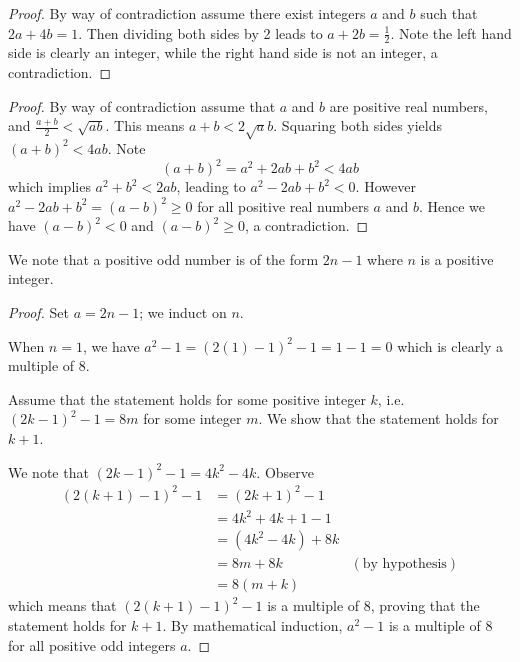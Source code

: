 \begin{questions}
    \item \begin{proof}
        By way of contradiction assume there exist integers $a$ and $b$ such that $2a + 4b = 1$. Then dividing both sides by 2 leads to $a + 2b = \frac12$. Note the left hand side is clearly an integer, while the right hand side is not an integer, a contradiction.    
    \end{proof}
    
    \item \begin{proof}
        By way of contradiction assume that $a$ and $b$ are positive real numbers, and $\frac{a+b}{2} < \sqrt{ab}$. This means $a+b<2\sqrt ab$. Squaring both sides yields $(a+b)^2 < 4ab$. Note
        \[
            (a+b)^2 = a^2 + 2ab + b^2 < 4ab    
        \]
        which implies $a^2 + b^2 < 2ab$, leading to $a^2 - 2ab + b^2 < 0$. However $a^2 - 2ab + b^2 = (a-b)^2 \geq 0$ for all positive real numbers $a$ and $b$. Hence we have $(a-b)^2 < 0$ and $(a-b)^2 \geq 0$, a contradiction.
    \end{proof}
    
    \item We note that a positive odd number is of the form $2n - 1$ where $n$ is a positive integer.
    
    \begin{proof}
        Set $a = 2n - 1$; we induct on $n$.
    
        When $n = 1$, we have $a^2 - 1 = (2(1) - 1)^2 - 1 = 1 - 1 = 0$ which is clearly a multiple of 8.
        
        Assume that the statement holds for some positive integer $k$, i.e. $(2k-1)^2 - 1 = 8m$ for some integer $m$. We show that the statement holds for $k + 1$.
        
        We note that $(2k-1)^2 - 1 = 4k^2 - 4k$. Observe
        \begin{align*}
            (2(k+1)-1)^2 - 1 &= (2k+1)^2 - 1\\
            &= 4k^2 + 4k + 1 - 1\\
            &= (4k^2 - 4k) + 8k\\
            &= 8m + 8k & (\text{by hypothesis})\\
            &= 8(m+k)
        \end{align*}
        which means that $(2(k+1)-1)^2 - 1$ is a multiple of 8, proving that the statement holds for $k+1$. By mathematical induction, $a^2 - 1$ is a multiple of 8 for all positive odd integers $a$.
    \end{proof}
    

\end{questions}

